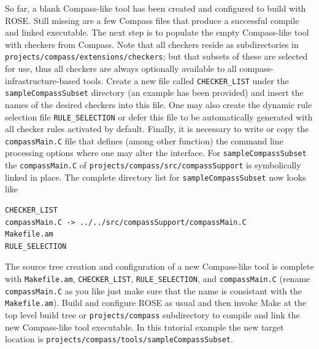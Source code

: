 So far, a blank Compass-like tool has been created and configured to build with
ROSE. Still missing are a few Compass files that produce a successful
compile and linked executable. The next step is to populate the empty 
Compass-like tool with checkers from Compass. Note that all checkers
reside as subdirectories in {\tt projects/compass/extensions/checkers};
but that subsets of
these are selected for use, thus all checkers are always optionally available 
to all compass-infrastructure-based tools.  Create a new file called
{\tt CHECKER\_LIST} under the {\tt sampleCompassSubset} directory (an
example has been provided) and insert the names of the desired checkers into
this file. One may also create the dynamic rule selection file 
{\tt RULE\_SELECTION} or defer this file to be automatically generated with
all checker rules activated by default. Finally, it is necessary to write or
copy the {\tt compassMain.C} file that defines (among other function)
the command line processing options where one may alter the interface. 
For {\tt sampleCompassSubset} the {\tt compassMain.C} of 
{\tt projects/compass/src/compassSupport} 
is symbolically linked in place. The complete directory list for 
{\tt sampleCompassSubset} now looks like

\begin{verbatim}
CHECKER_LIST
compassMain.C -> ../../src/compassSupport/compassMain.C
Makefile.am
RULE_SELECTION
\end{verbatim}

The source tree creation and configuration of a new Compass-like tool is 
complete with {\tt Makefile.am}, {\tt CHECKER\_LIST}, {\tt RULE\_SELECTION},
and {\tt compassMain.C} (rename {\tt compassMain.C} as you like just make
sure that the name is consistant with the {\tt Makefile.am}). Build and 
configure ROSE as usual and then invoke Make at the top level build tree 
or {\tt projects/compass} subdirectory to
compile and link the new Compass-like tool executable. In this tutorial 
example the new target location is 
{\tt projects/compass/tools/sampleCompassSubset}.
